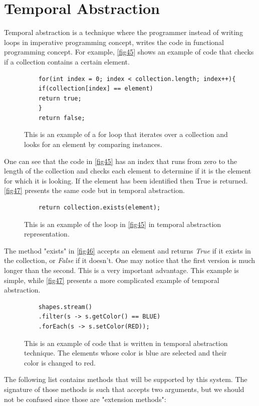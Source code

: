 \section{Temporal Abstraction} \label{sec:Temporal Abstraction}
Temporal abstraction is a technique where the programmer instead of writing loops in imperative programming concept, writes the code in functional programming concept. For example, \autoref{fig45} shows an example of code that checks if a collection contains a certain element.
\begin{figure}[H]
	\begin{lstlisting}
	for(int index = 0; index < collection.length; index++){
	if(collection[index] == element)
	return true;
	}
	return false;
	\end{lstlisting}
	\caption{This is an example of a for loop that iterates over a collection and looks for an element by comparing instances.}
	\label{fig45}
\end{figure}
One can see that the code in \autoref{fig45} has an index that runs from zero to the length of the collection and checks each element to determine if it is the element for which it is looking. If the element has been identified then True is returned. \autoref{fig47} presents the same code but in temporal abstraction.
\begin{figure}[H]
	\begin{lstlisting}
	return collection.exists(element);
	\end{lstlisting}
	\caption{This is an example of the loop in \autoref{fig45} in temporal abstraction representation.}
	\label{fig46}
\end{figure}
The method "exists" in \autoref{fig46} accepts an element and returns \textit{True} if it exists in the collection, or \textit{False} if it doesn't. One may notice that the first version is much longer than the second. This is a very important advantage. This example is simple, while \autoref{fig47} presents a more complicated example of temporal abstraction.
\begin{figure}[H]
	\begin{lstlisting}
	shapes.stream()
	.filter(s -> s.getColor() == BLUE)
	.forEach(s -> s.setColor(RED));
	\end{lstlisting}
	\caption{This is an example of code that is written in temporal abstraction technique. The elements whose color is blue are selected and their color is changed to red.}
	\label{fig47}
\end{figure}
The following list contains methods that will be supported by this system. The signature of those methods is such that accepts two arguments, but we should not be confused since those are "extension methods":
